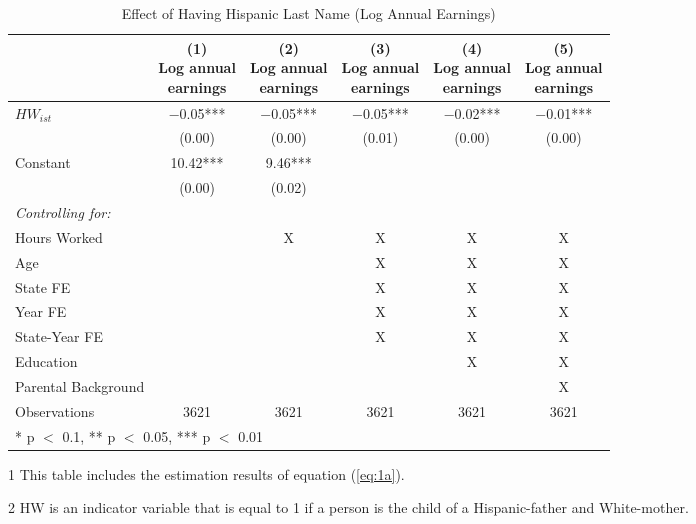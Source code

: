 \begin{table}[H]
\centering\centering
\caption*{Effect of Having Hispanic Last Name (Log Annual Earnings)}
\centering
\begin{threeparttable}
\begin{tabular}[t]{lccccc}
\toprule
  & \specialcell{(1) \\ Log annual \\ earnings} & \specialcell{(2) \\ Log annual \\ earnings} & \specialcell{(3) \\ Log annual \\ earnings} & \specialcell{(4) \\  Log annual \\ earnings} & \specialcell{(5) \\  Log annual \\ earnings}\\
\midrule
$HW_{ist}$ & \num{-0.05}*** & \num{-0.05}*** & \num{-0.05}*** & \num{-0.02}*** & \num{-0.01}***\\
 & (\num{0.00}) & (\num{0.00}) & (\num{0.01}) & (\num{0.00}) & (\num{0.00})\\
Constant & \num{10.42}*** & \num{9.46}*** &  &  & \\
 & (\num{0.00}) & (\num{0.02}) &  &  & \\
\midrule
\textit{Controlling for:} &  &  &  &  & \\
Hours Worked &  & X & X & X & X\\
Age &  &  & X & X & X\\
State FE &  &  & X & X & X\\
Year FE &  &  & X & X & X\\
State-Year FE &  &  & X & X & X\\
Education &  &  &  & X & X\\
Parental Background &  &  &  &  & X\\
Observations & \num{3621} & \num{3621} & \num{3621} & \num{3621} & \num{3621}\\
\bottomrule
\multicolumn{6}{l}{\rule{0pt}{1em}* p $<$ 0.1, ** p $<$ 0.05, *** p $<$ 0.01}\\
\end{tabular}
\begin{tablenotes}
\item[1] {\footnotesize{This table includes the estimation results of equation (\ref{eq:1a}).}}
\item[2] {\footnotesize{HW is an indicator variable that is equal to 1 if a person is the child of a Hispanic-father and White-mother.}}

\end{tablenotes}
\end{threeparttable}
\end{table}
